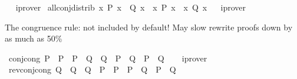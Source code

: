 \begin{isabellebody}
\isadelimproof
\ %
\endisadelimproof
%
\isatagproof
{}\isamarkupfalse%
\ iprover%
\endisatagproof
{\isafoldproof}%
%
\isadelimproof
%
\endisadelimproof
\isanewline
{}\isamarkupfalse%
\ all{\isacharunderscore}{\kern0pt}conj{\isacharunderscore}{\kern0pt}distrib{\isacharcolon}{\kern0pt}\ {\isachardoublequoteopen}{\isacharparenleft}{\kern0pt}{\isasymforall}x{\isachardot}{\kern0pt}\ P\ x\ {\isasymand}\ Q\ x{\isacharparenright}{\kern0pt}\ {\isasymlongleftrightarrow}\ {\isacharparenleft}{\kern0pt}{\isasymforall}x{\isachardot}{\kern0pt}\ P\ x{\isacharparenright}{\kern0pt}\ {\isasymand}\ {\isacharparenleft}{\kern0pt}{\isasymforall}x{\isachardot}{\kern0pt}\ Q\ x{\isacharparenright}{\kern0pt}{\isachardoublequoteclose}%
\isadelimproof
\ %
\endisadelimproof
%
\isatagproof
{}\isamarkupfalse%
\ iprover%
\endisatagproof
{\isafoldproof}%
%
\isadelimproof
%
\endisadelimproof
%
\begin{isamarkuptext}%
\medskip The \isa{{\isasymand}} congruence rule: not included by default!
  May slow rewrite proofs down by as much as 50\%%
\end{isamarkuptext}\isamarkuptrue%
\isamarkupfalse%
\ conj{\isacharunderscore}{\kern0pt}cong{\isacharcolon}{\kern0pt}\ {\isachardoublequoteopen}P\ {\isacharequal}{\kern0pt}\ P{\isacharprime}{\kern0pt}\ {\isasymLongrightarrow}\ {\isacharparenleft}{\kern0pt}P{\isacharprime}{\kern0pt}\ {\isasymLongrightarrow}\ Q\ {\isacharequal}{\kern0pt}\ Q{\isacharprime}{\kern0pt}{\isacharparenright}{\kern0pt}\ {\isasymLongrightarrow}\ {\isacharparenleft}{\kern0pt}P\ {\isasymand}\ Q{\isacharparenright}{\kern0pt}\ {\isacharequal}{\kern0pt}\ {\isacharparenleft}{\kern0pt}P{\isacharprime}{\kern0pt}\ {\isasymand}\ Q{\isacharprime}{\kern0pt}{\isacharparenright}{\kern0pt}{\isachardoublequoteclose}\isanewline
%
\isadelimproof
\ \ %
\endisadelimproof
%
\isatagproof
{}\isamarkupfalse%
\ iprover%
\endisatagproof
{\isafoldproof}%
%
\isadelimproof
\isanewline
%
\endisadelimproof
\isanewline
{}\isamarkupfalse%
\ rev{\isacharunderscore}{\kern0pt}conj{\isacharunderscore}{\kern0pt}cong{\isacharcolon}{\kern0pt}\ {\isachardoublequoteopen}Q\ {\isacharequal}{\kern0pt}\ Q{\isacharprime}{\kern0pt}\ {\isasymLongrightarrow}\ {\isacharparenleft}{\kern0pt}Q{\isacharprime}{\kern0pt}\ {\isasymLongrightarrow}\ P\ {\isacharequal}{\kern0pt}\ P{\isacharprime}{\kern0pt}{\isacharparenright}{\kern0pt}\ {\isasymLongrightarrow}\ {\isacharparenleft}{\kern0pt}P\ {\isasymand}\ Q{\isacharparenright}{\kern0pt}\ {\isacharequal}{\kern0pt}\ {\isacharparenleft}{\kern0pt}P{\isacharprime}{\kern0pt}\ {\isasymand}\ Q{\isacharprime}{\kern0pt}{\isacharparenright}{\kern0pt}{\isachardoublequoteclose}\isanewline

\end{isabellebody}

